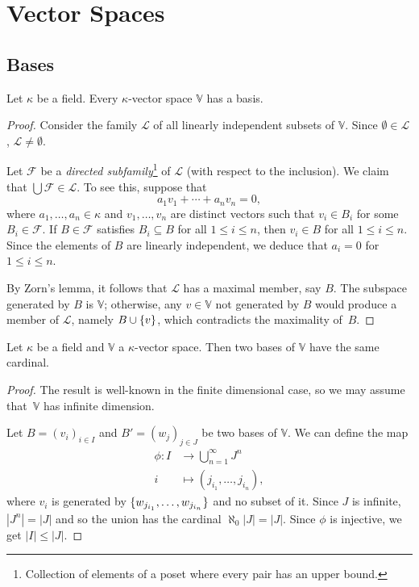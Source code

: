 \chapter{Vector Spaces}

\section{Bases}\label{sec:bases}

\begin{thm}
    Let\/ $\kappa$ be a field. Every\/ $\kappa$-vector space\/ $\mathbb V$ has a basis.
\end{thm}

\begin{proof}
    Consider the family $\mathcal L$ of all linearly independent subsets of $\mathbb V$. Since $\emptyset\in\mathcal L$, $\mathcal L\ne\emptyset$.

    Let $\mathcal F$ be a \textsl{directed subfamily}\footnote{Collection of elements of a poset where every pair has an upper bound.} of $\mathcal L$ (with respect to the inclusion). We claim that $\bigcup\mathcal F\in\mathcal L$. To see this, suppose that
    $$
        a_1v_1+\cdots+a_nv_n=0,
    $$
    where $a_1,\dots,a_n\in\kappa$ and $v_1,\dots,v_n$ are distinct vectors such that $v_i\in B_i$ for some $B_i\in\mathcal F$. If $B\in\mathcal F$ satisfies $B_i\subseteq B$ for all $1\le i\le n$, then $v_i\in B$ for all $1\le i\le n$. Since the elements of $B$ are linearly independent, we deduce that $a_i=0$ for $1\le i\le n$.

    By Zorn's lemma, it follows that $\mathcal L$ has a maximal member, say $B$. The subspace generated by $B$ is $\mathbb V$; otherwise, any $v\in\mathbb V$ not generated by $B$ would produce a member of $\mathcal L$, namely $B\cup\{v\}$, which contradicts the maximality of~$B$.
\end{proof}

\begin{thm}
    Let\/ $\kappa$ be a field and $\mathbb V$ a $\kappa$-vector space. Then two bases of $\mathbb V$ have the same cardinal.
\end{thm}

\begin{proof}
    The result is well-known in the finite dimensional case, so we may assume that~$\mathbb V$ has infinite dimension.

    Let $B=(v_i)_{i\in I}$ and $B'=(w_j)_{j\in J}$ be two bases of $\mathbb V$. We can define the map
    \begin{align*}
        \phi\colon I&\to\bigcup_{n=1}^\infty J^n\\
        i&\mapsto(j_{i_1},\dots,j_{i_n}),
    \end{align*}
    where $v_i$ is generated by $\{w_{j_{i_1}},\dots,w_{j_{i_n}}\}$ and no subset of it. Since $J$ is infinite, $|J^n|=|J|$ and so the union has the cardinal $\aleph_0|J|=|J|$. Since $\phi$ is injective, we get $|I|\le|J|$.
\end{proof}